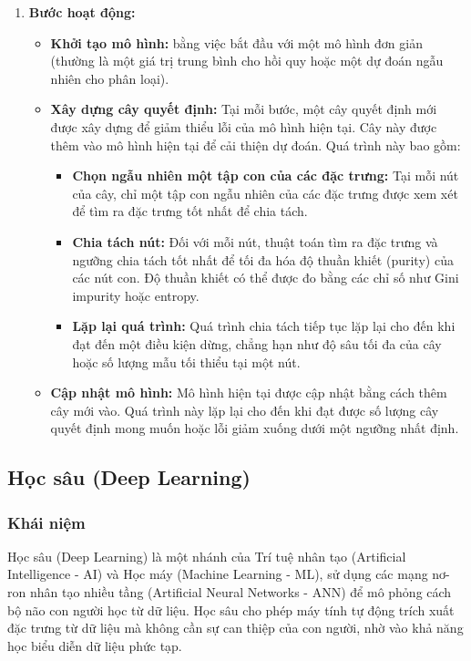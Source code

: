 \documentclass[13pt]{article}
\begin{document}
\begin{enumerate}
\begin{enumerate}
        \item \textbf{Bước hoạt động: }
        \begin{itemize}
            \item \textbf{Khởi tạo mô hình: } bằng việc bắt đầu với một mô hình đơn giản (thường là một giá trị trung bình cho hồi quy hoặc một dự đoán ngẫu nhiên cho phân loại).
            \item \textbf{Xây dựng cây quyết định: } Tại mỗi bước, một cây quyết định mới được xây dựng để giảm thiểu lỗi của mô hình hiện tại. Cây này được thêm vào mô hình hiện tại để cải thiện dự đoán. Quá trình này bao gồm:
            \begin{itemize}
                \item \textbf{Chọn ngẫu nhiên một tập con của các đặc trưng: } Tại mỗi nút của cây, chỉ một tập con ngẫu nhiên của các đặc trưng được xem xét để tìm ra đặc trưng tốt nhất để chia tách.
                \item \textbf{Chia tách nút: } Đối với mỗi nút, thuật toán tìm ra đặc trưng và ngưỡng chia tách tốt nhất để tối đa hóa độ thuần khiết (purity) của các nút con. Độ thuần khiết có thể được đo bằng các chỉ số như Gini impurity hoặc entropy.
                \item \textbf{Lặp lại quá trình: } Quá trình chia tách tiếp tục lặp lại cho đến khi đạt đến một điều kiện dừng, chẳng hạn như độ sâu tối đa của cây hoặc số lượng mẫu tối thiểu tại một nút.
            \end{itemize}
        \item \textbf{Cập nhật mô hình: } Mô hình hiện tại được cập nhật bằng cách thêm cây mới vào. Quá trình này lặp lại cho đến khi đạt được số lượng cây quyết định mong muốn hoặc lỗi giảm xuống dưới một ngưỡng nhất định.
        \end{itemize}
    \end{enumerate}
\end{enumerate}

\subsection{Học sâu (Deep Learning)}
\subsubsection{Khái niệm}
Học sâu (Deep Learning) là một nhánh của Trí tuệ nhân tạo (Artificial Intelligence - AI) và Học máy (Machine Learning - ML), sử dụng các mạng nơ-ron nhân tạo nhiều tầng (Artificial Neural Networks - ANN) để mô phỏng cách bộ não con người học từ dữ liệu. Học sâu cho phép máy tính tự động trích xuất đặc trưng từ dữ liệu mà không cần sự can thiệp của con người, nhờ vào khả năng học biểu diễn dữ liệu phức tạp.\\
\end{document}
